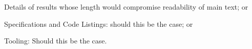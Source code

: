 \documentclass[
  oneside,
  11pt, a4paper,
  footinclude=true,
  headinclude=true,
  cleardoublepage=empty
]{scrbook}
\begin{document}
	Details of results whose length would compromise readability of main text; or

	Specifications and Code Listings: should this be the case; or

	Tooling: Should this be the case.



\end{document}
